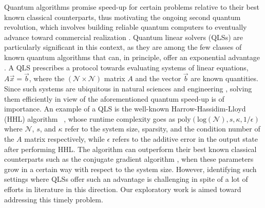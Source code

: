 \documentclass[%
 reprint,
 superscriptaddress,
 amsmath,amssymb,
 aps,
 pra,
floatfix,
nofootinbib,
]{revtex4-2}
\theoremstyle{definition}
\theoremstyle{remark}
\begin{document}
Quantum algorithms promise speed-up for certain problems relative to their best known classical counterparts, thus motivating the ongoing second quantum revolution, which involves building reliable quantum computers to eventually advance toward commercial realization \cite{scholten2024assessing, bova2021commercial, gill2025quantum, macquarrie2020emerging, cumming2022using, sinno2023performance, ruane2025quantum}. Quantum linear solvers (QLSs) are particularly significant in this context, as they are among the few classes of known quantum algorithms that can, in principle, offer an exponential advantage  \cite{morales}. A QLS prescribes a protocol towards evaluating systems of linear equations, $A\vec{x}=\vec{b}$, where the $(\mathcal{N} \times \mathcal{N})$ matrix $A$ and the vector $\vec{b}$ are known quantities. Since such systems are ubiquitous in natural sciences and engineering \cite{anton2013elementary, machol1961linear, hamid2019balancing, wilson1958solution}, solving them efficiently in view of the aforementioned quantum speed-up is of importance. An example of a QLS is the well-known Harrow-Hassidim-Lloyd (HHL) algorithm ~\cite{Harrow2009QuantumEquations}, whose runtime complexity goes as $\mathrm{poly}(\mathrm{log}(\mathcal{N}), s, \kappa, 1/\epsilon)$ where $\mathcal{N}$, $s$, and $\kappa$ refer to the system size, sparsity, and the condition number of the $A$ matrix respectively, while $\epsilon$ refers to the additive error in the output state after performing HHL. The algorithm can outperform their best known classical counterparts such as the conjugate gradient algorithm \cite{cg1994}, when these parameters grow in a certain way with respect to the system size. However, identifying such settings where QLSs offer such an advantage is challenging in spite of a lot of efforts in literature in this direction. Our exploratory work is aimed toward addressing this timely problem. 
\end{document}
